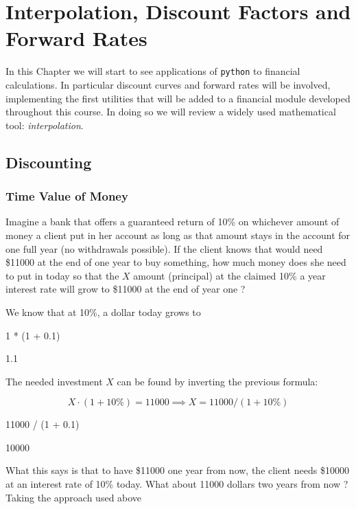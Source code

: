 \chapter{Interpolation, Discount Factors and Forward Rates}
\label{interpolation}

In this Chapter we will start to see applications of \texttt{python} to financial calculations.
In particular discount curves and forward rates will be involved, implementing the first utilities that will be added to a financial module developed throughout this course.
In doing so we will review a widely used mathematical tool: \emph{interpolation}.

\section{Discounting}
\label{discount-factors}

\subsection{Time Value of Money}
Imagine a bank that offers a guaranteed return of 10\% on whichever amount of money a client put in her account as long as that amount stays in the account for one full year (no withdrawals possible). If the client knows that would need \$11000 at the end of one year to buy something, how much money does she need to put in today so that the $X$ amount (principal) at the claimed 10\% a year interest rate will grow to \$11000 at the end of year one ?

We know that at 10\%, a dollar today grows to

\begin{ipython}
1 * (1 + 0.1)
\end{ipython}
\begin{ioutput}
1.1
\end{ioutput}

The needed investment $X$ can be found by inverting the previous formula:

\begin{equation*}
X \cdot (1 + 10\%) = 11000 \implies X = 11000 / (1 + 10\%)
\end{equation*}

\begin{ipython}
11000 / (1 + 0.1)
\end{ipython}
\begin{ioutput}
10000
\end{ioutput}

What this says is that to have \$11000 one year from now, the client needs \$10000 at an interest rate of 10\% today.
What about 11000 dollars two years from now ? Taking the approach used above


